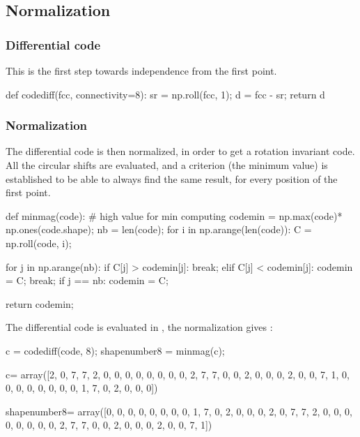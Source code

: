 \subsection{Normalization}
\subsubsection{Differential code}
This is the first step towards independence from the first point.

\begin{python}
def codediff(fcc, connectivity=8):
    sr = np.roll(fcc, 1);
    d = fcc - sr;
    return d%
\end{python}

\subsubsection{Normalization}
The differential code is then normalized, in order to get a rotation invariant code. All the circular shifts are evaluated, and a criterion (the minimum value) is established to be able to always find the same result, for every position of the first point.

\begin{python}
def minmag(code):    
    # high value for min computing
    codemin = np.max(code)* np.ones(code.shape);
    nb = len(code);
    for i in np.arange(len(code)):
        C = np.roll(code, i);
        
        for j in np.arange(nb):
            if C[j] > codemin[j]:
                break;
            elif C[j] < codemin[j]:
                codemin = C;
                break;
            if j == nb:        
                codemin = C;
        
    return codemin;
\end{python}

The differential code is evaluated in , the normalization gives :
\begin{python}
c = codediff(code, 8);
shapenumber8 = minmag(c);
\end{python}

\begin{sh}
c= array([2, 0, 7, 7, 2, 0, 0, 0, 0, 0, 0, 0, 0, 2, 7, 7, 0, 0, 2, 0, 0, 0, 2, 0, 0, 7, 1, 0, 0, 0, 0, 0, 0, 0, 0, 1, 7, 0, 2, 0, 0, 0])

shapenumber8= array([0, 0, 0, 0, 0, 0, 0, 0, 1, 7, 0, 2, 0, 0, 0, 2, 0, 7, 7, 2, 0, 0, 0, 0, 0, 0, 0, 0, 2, 7, 7, 0, 0, 2, 0, 0, 0, 2, 0, 0, 7, 1])
\end{sh}

